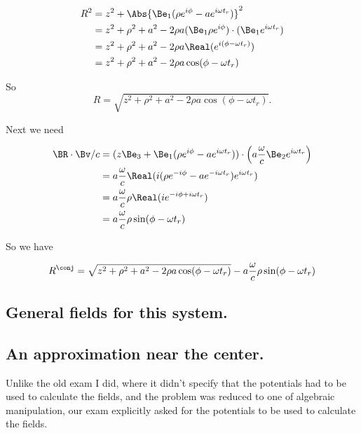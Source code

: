 \begin{align*}
R^2 
&= z^2 + \Abs{\Be_1 (\rho e^{i \phi} - a e^{i \omega t_r} )}^2 \\
&= z^2 + \rho^2 + a^2 - 2 \rho a (\Be_1 \rho e^{i \phi}) \cdot (\Be_1 e^{i \omega t_r}) \\
&= z^2 + \rho^2 + a^2 - 2 \rho a \Real( e^{ i(\phi - \omega t_r) } ) \\
&= z^2 + \rho^2 + a^2 - 2 \rho a \cos(\phi - \omega t_r)
\end{align*}

So
\begin{equation}\label{eqn:relativisticElectrodynamicsExamReflection:n}
R = \sqrt{z^2 + \rho^2 + a^2 - 2 \rho a \cos( \phi - \omega t_r ) }.
\end{equation}

Next we need

\begin{align*}
\BR \cdot \Bv/c
&= 
(z \Be_3 + \Be_1 (\rho e^{i \phi} - a e^{i \omega t_r} )) \cdot  
\left(a \frac{\omega}{c} \Be_2 e^{i \omega t_r} \right) \\
&=
a \frac{\omega }{c}
\Real(
i (\rho e^{-i \phi} - a e^{-i \omega t_r} ) e^{i \omega t_r} ) \\
&=
a \frac{\omega }{c}
\rho \Real( i e^{-i \phi + i \omega t_r} ) \\
&=
a \frac{\omega }{c}
\rho \sin(\phi - \omega t_r)
\end{align*}

So we have

\begin{equation}\label{eqn:relativisticElectrodynamicsExamReflection:n}
R^\conj = \sqrt{z^2 + \rho^2 + a^2 - 2 \rho a \cos( \phi - \omega t_r ) }
-a \frac{\omega }{c} \rho \sin(\phi - \omega t_r)
\end{equation}

\subsection{General fields for this system.}

\subsection{An approximation near the center.}

Unlike the old exam I did, where it didn't specify that the potentials had to be used to calculate the fields, and the problem was reduced to one of algebraic manipulation, our exam explicitly asked for the potentials to be used to calculate the fields.


